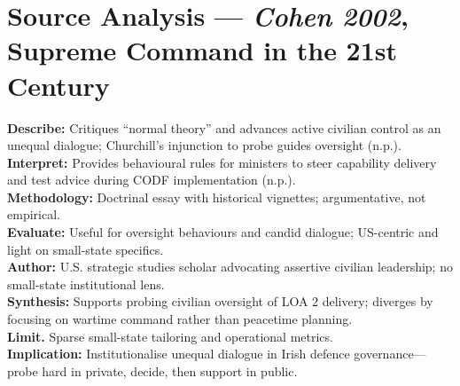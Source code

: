 \section*{Source Analysis — \textit{Cohen 2002}, Supreme Command in the 21st Century}
\textbf{Describe:} Critiques “normal theory” and advances active civilian control as an unequal dialogue; Churchill’s injunction to probe guides oversight (n.p.).\\
\textbf{Interpret:} Provides behavioural rules for ministers to steer capability delivery and test advice during CODF implementation (n.p.).\\
\textbf{Methodology:} Doctrinal essay with historical vignettes; argumentative, not empirical.\\
\textbf{Evaluate:} Useful for oversight behaviours and candid dialogue; US-centric and light on small-state specifics.\\
\textbf{Author:} U.S. strategic studies scholar advocating assertive civilian leadership; no small-state institutional lens.\\
\textbf{Synthesis:} Supports probing civilian oversight of LOA 2 delivery; diverges by focusing on wartime command rather than peacetime planning.\\
\textbf{Limit.} Sparse small-state tailoring and operational metrics.\\
\textbf{Implication:} Institutionalise unequal dialogue in Irish defence governance—probe hard in private, decide, then support in public.

\parencite{DUMAN_2025} 

